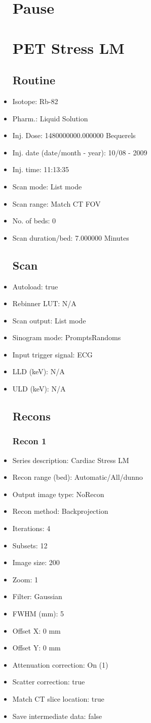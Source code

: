 \documentclass[12pt]{article}
\begin{document}
\begin{itemize}
\section{Pause}
\section{PET Stress LM}\subsection{Routine}
\item Isotope: Rb-82
\item Pharm.: Liquid Solution
\item Inj. Dose: 1480000000.000000 Bequerels
\item Inj. date (date/month - year): 10/08 - 2009
\item Inj. time: 11:13:35
\item Scan mode: List mode
\item Scan range: Match CT FOV
\item No. of beds: 0
\item Scan duration/bed: 7.000000 Minutes
\subsection{Scan}
\item Autoload: true
\item Rebinner LUT: N/A
\item Scan output: List mode
\item Sinogram mode: PromptsRandoms
\item Input trigger signal: ECG
\item LLD (keV): N/A
\item ULD (keV): N/A
\subsection{Recons}
\subsubsection{Recon 1}
\item Series description: Cardiac Stress LM
\item Recon range (bed): Automatic/All/dunno
\item Output image type: NoRecon
\item Recon method: Backprojection
\item Iterations: 4
\item Subsets: 12
\item Image size: 200
\item Zoom: 1
\item Filter: Gaussian
\item FWHM (mm): 5
\item Offset X: 0 mm
\item Offset Y: 0 mm
\item Attenuation correction: On (1)
\item Scatter correction: true
\item Match CT slice location: true
\item Save intermediate data: false

\end{itemize}
\end{document}
